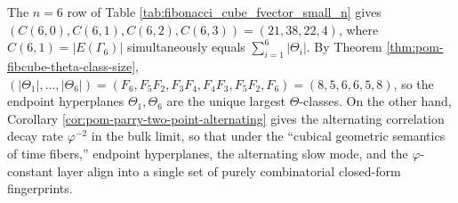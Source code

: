\begin{remark}[Instantiation at the minimal window \(m=6\)]\label{rem:pom-fiber-hyperplane-m6}
The \(n=6\) row of Table \ref{tab:fibonacci_cube_fvector_small_n} gives \((C(6,0),C(6,1),C(6,2),C(6,3))=(21,38,22,4)\),
where \(C(6,1)=|E(\Gamma_6)|\) simultaneously equals \(\sum_{i=1}^{6}|\Theta_i|\).
By Theorem \ref{thm:pom-fibcube-theta-class-size},
\(
(|\Theta_1|,\dots,|\Theta_6|)=(F_6,F_5F_2,F_3F_4,F_4F_3,F_5F_2,F_6)=(8,5,6,6,5,8)
\),
so the endpoint hyperplanes \(\Theta_1,\Theta_6\) are the unique largest \(\Theta\)-classes.
On the other hand, Corollary \ref{cor:pom-parry-two-point-alternating} gives the alternating correlation decay rate \(\varphi^{-2}\) in the bulk limit,
so that under the ``cubical geometric semantics of time fibers,'' endpoint hyperplanes, the alternating slow mode, and the \(\varphi\)-constant layer align into a single set of purely combinatorial closed-form fingerprints.
\end{remark}
